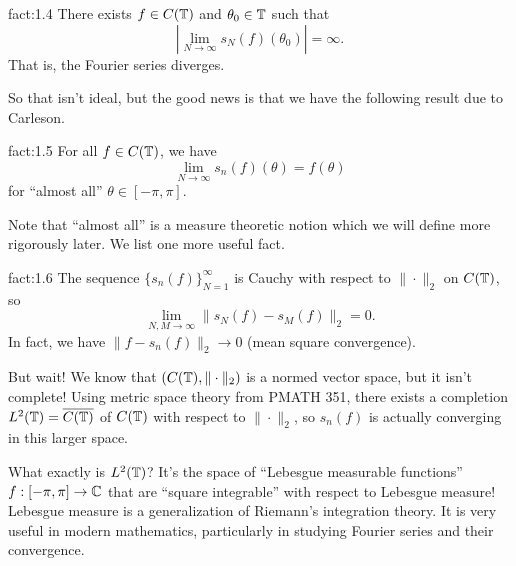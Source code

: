 \begin{fact}{fact:1.4}
    There exists $f \in C(\mathbb{T})$ and $\theta_0 \in \mathbb{T}$ such that 
    \[ \left| \lim_{N\to\infty} s_N(f)(\theta_0) \right| = \infty. \] 
    That is, the Fourier series diverges.
\end{fact} 

So that isn't ideal, but the good news is that we have the following 
result due to Carleson.

\begin{fact}[Carleson]{fact:1.5}
    For all $f \in C(\mathbb{T})$, we have 
    \[ \lim_{N\to\infty} s_n(f)(\theta) = f(\theta) \] 
    for ``almost all'' $\theta \in [-\pi, \pi]$. 
\end{fact} 

Note that ``almost all'' is a measure theoretic notion which we will define 
more rigorously later. We list one more useful fact. 

\begin{fact}{fact:1.6}
    The sequence $\{s_n(f)\}_{N=1}^\infty$ is Cauchy with respect to 
    $\|\cdot\|_2$ on $C(\mathbb{T})$, so 
    \[ \lim_{N,M\to\infty} \|s_N(f) - s_M(f)\|_2 = 0. \] 
    In fact, we have $\|f - s_n(f)\|_2 \to 0$ (mean square convergence). 
\end{fact} 

But wait! We know that $(C(\mathbb{T}), \|\cdot\|_2)$ is a normed vector space, 
but it isn't complete! Using metric space theory from PMATH 351, there 
exists a completion $L^2(\mathbb{T}) = \overline{C(\mathbb{T})}$ of $C(\mathbb{T})$ with respect to 
$\|\cdot\|_2$, so $s_n(f)$ is actually converging in this larger space. 

What exactly is $L^2(\mathbb{T})$? It's the space of ``Lebesgue measurable functions''
$f : [-\pi, \pi] \to \mathbb{C}$ that are ``square integrable'' with respect to 
Lebesgue measure! Lebesgue measure is a generalization of Riemann's 
integration theory. It is very useful in modern mathematics, particularly 
in studying Fourier series and their convergence. 

